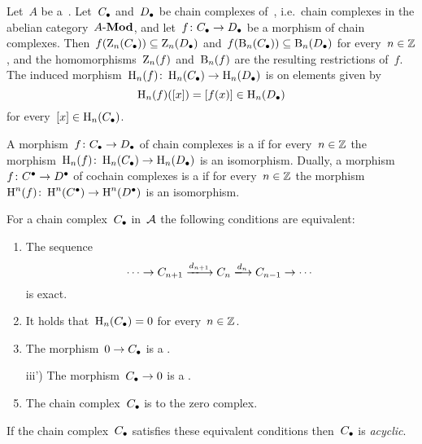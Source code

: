 \begin{example*}
  Let~$A$ be a~{\kalg}.
  Let~$C_\bullet$ and~$D_\bullet$ be chain complexes of~{}, i.e.\ chain complexes in the abelian category~$\text{$A$-$\mathbf{Mod}$}$, and let~$f \colon C_\bullet \to D_\bullet$ be a morphism of chain complexes.
  Then~$f(\operatorname{Z}_n(C_\bullet)) \subseteq \operatorname{Z}_n(D_\bullet)$ and~$f(\operatorname{B}_n(C_\bullet)) \subseteq \operatorname{B}_n(D_\bullet)$ for every~$n \in \mathbb{Z}$, and the homomorphisms~$\operatorname{Z}_n(f)$ and~$\operatorname{B}_n(f)$ are the resulting restrictions of~$f$.
  The induced morphism~$\operatorname{H}_n(f) \colon \operatorname{H}_n(C_\bullet) \to \operatorname{H}_n(D_\bullet)$ is on elements given by
  \[
        \operatorname{H}_n(f)( [x] )
    =   [f(x)]
    \in \operatorname{H}_n(D_\bullet)
  \]
  for every~$[x] \in \operatorname{H}_n(C_\bullet)$.
\end{example*}


\begin{definition}
  A morphism~$f \colon C_\bullet \to D_\bullet$ of chain complexes is a \emph{{\qim}} if for every~$n \in \mathbb{Z}$ the morphism~$\operatorname{H}_n(f) \colon \operatorname{H}_n(C_\bullet) \to \operatorname{H}_n(D_\bullet)$ is an isomorphism.
  Dually, a morphism~$f \colon C^\bullet \to D^\bullet$ of cochain complexes is a \emph{{\qim}} if for every~$n \in \mathbb{Z}$ the morphism~$\operatorname{H}^n(f) \colon \operatorname{H}^n(C^\bullet) \to \operatorname{H}^n(D^\bullet)$ is an isomorphism.
\end{definition}


\begin{remarkdefinition}
  For a chain complex~$C_\bullet$ in~$\mathcal{A}$ the following conditions are equivalent:
  \begin{enumerate}
    \item
      The sequence
      \[
        \dotsb
        \to
        C_{n+1}
        \xlongto{d_{n+1}}
        C_n
        \xlongto{d_n}
        C_{n-1}
        \to
        \dotsb
      \]
      is exact.
    \item
      It holds that~$\operatorname{H}_n(C_\bullet) = 0$ for every~$n \in \mathbb{Z}$.
    \item
      The morphism~$0 \to C_\bullet$ is a {\qim}.
    \item[iii')]
      The morphism~$C_\bullet \to 0$ is a {\qim}.
    \item
      The chain complex~$C_\bullet$ is {\qic} to the zero complex.
  \end{enumerate}
  If the chain complex~$C_\bullet$ satisfies these equivalent conditions then~$C_\bullet$ is \emph{acyclic}.
\end{remarkdefinition}


